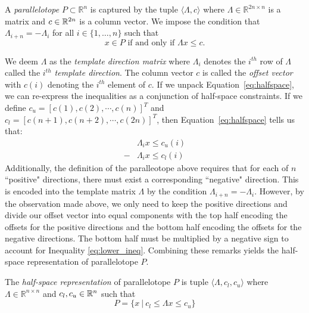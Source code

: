 \begin{definition}
\label{def:ptope}
A \emph{parallelotope} $P \subset \mathbb{R}^{n}$ is captured by the tuple $\langle \Lambda, c\rangle$ where $\Lambda \in \mathbb{R}^{2n \times n}$ is a matrix and $c \in {\mathbb{R}}^{2n}$ is a column vector. We impose the condition that $\Lambda_{i+n} = -\Lambda_{i}$ for all $i \in \{1, \ldots, n\}$ such that
%
\begin{equation}
\label{eq:halfspace}
x \in P \mbox{ if and only if } \Lambda x \leq c.
\end{equation}
\end{definition}
%
We deem $\Lambda$ as the \emph{template direction matrix} where $\Lambda_i$ denotes the $i^{th}$ row of $\Lambda$ called the \emph{$i^{th}$ template direction}. The column vector $c$ is called the \emph{offset vector} with $c(i)$ denoting the $i^{th}$ element of $c$.
%
If we unpack Equation~\ref{eq:halfspace}, we can re-express the inequalities as a conjunction of half-space constraints. If we define $c_{u} = [c(1), c(2), \cdots, c(n)]^T$ and $c_{l} = [c(n+1), c(n+2), \cdots, c(2n)]^T$, then Equation~\ref{eq:halfspace} tells us that:
%
\begin{align}
  & \Lambda_i x \leq c_u(i)  \label{eq:upper_ineq}\\
  -& \Lambda_i x \leq c_l(i) \label{eq:lower_ineq}
\end{align}
%
Additionally, the definition of the paralleotope above requires that for each of $n$ ``positive" directions, there must exist a corresponding ``negative" direction. This is encoded into the template matrix $\Lambda$ by the condition $\Lambda_{i+n} = -\Lambda_{i}$. However, by the observation made above, we only need to keep the positive directions and divide our offset vector into equal components with the top half encoding the offsets for the positive directions and the bottom half encoding the offsets for the negative directions. The bottom half must be multiplied by a negative sign to account for Inequality \ref{eq:lower_ineq}.
%
Combining these remarks yields the half-space representation of parallelotope $P$.
%
\begin{definition}
\label{def:halfspace_def}
The \emph{half-space representation} of parallelotope $P$ is tuple  $\langle \Lambda, c_l, c_u \rangle$ where $\Lambda \in \mathbb{R}^{n \times n}$ and $c_l, c_u \in {\mathbb{R}}^n$
such that
\begin{equation}
\label{eq:halfspaceconst}
P =\{x ~|~ c_l \leq \Lambda x \leq c_u\}
\end{equation}
\end{definition}
